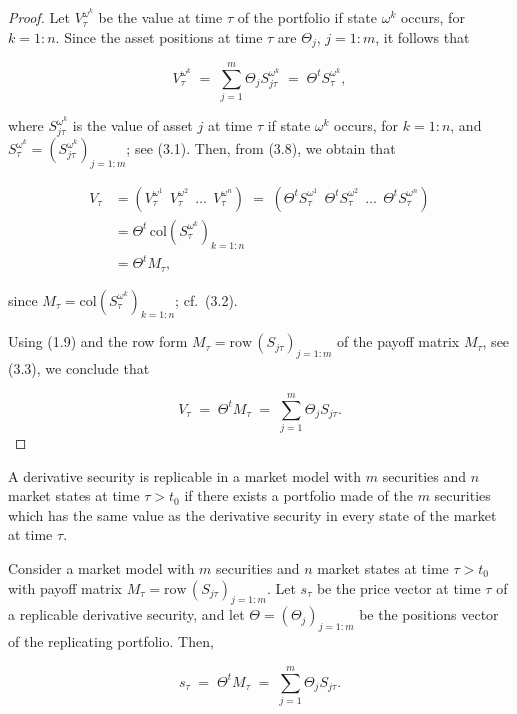\begin{proof}
Let $V_\tau^{\omega^k}$ be the value at time $\tau$ of the portfolio if
state $\omega^k$ occurs, for $k = 1:n$. Since the asset positions at time
$\tau$ are $\Theta_j$, $j = 1:m$, it follows that

\begin{equation}
V_\tau^{\omega^k} \;=\; \sum_{j=1}^m \Theta_j S_{j\tau}^{\omega^k} \;=\;
\Theta^t S_\tau^{\omega^k},
\end{equation}

where $S_{j\tau}^{\omega^k}$ is the value of asset $j$ at time $\tau$ if
state $\omega^k$ occurs, for $k = 1:n$, and $S_\tau^{\omega^k} =
\left(S_{j\tau}^{\omega^k}\right)_{j=1:m}$; see (3.1). Then, from (3.8), we
obtain that

\[
\begin{aligned}
V_\tau &= \left(V_\tau^{\omega^1}\ \ V_\tau^{\omega^2}\ \ \ldots\ \
V_\tau^{\omega^n}\right) \;=\; \left(\Theta^t S_\tau^{\omega^1}\ \ \Theta^t
S_\tau^{\omega^2}\ \ \ldots\ \ \Theta^t S_\tau^{\omega^n}\right) \\
&= \Theta^t\,\mathrm{col}\left(S_\tau^{\omega^k}\right)_{k=1:n} \\
&= \Theta^t M_\tau,
\end{aligned}
\]

since $M_\tau = \mathrm{col}\left(S_\tau^{\omega^k}\right)_{k=1:n}$; cf.\
(3.2).

Using (1.9) and the row form $M_\tau = \mathrm{row}\,(S_{j\tau})_{j=1:m}$
of the payoff matrix $M_\tau$, see (3.3), we conclude that

\[
V_\tau \;=\; \Theta^t M_\tau \;=\; \sum_{j=1}^m \Theta_j S_{j\tau}.
\]
\end{proof}

\begin{definition}
A derivative security is replicable in a market model with $m$ securities
and $n$ market states at time $\tau > t_0$ if there exists a portfolio
made of the $m$ securities which has the same value as the derivative
security in every state of the market at time $\tau$.
\end{definition}

\begin{lemma}
Consider a market model with $m$ securities and $n$ market states at time
$\tau > t_0$ with payoff matrix $M_\tau = \mathrm{row}\,(S_{j\tau})_{j=1:m}$.
Let $s_\tau$ be the price vector at time $\tau$ of a replicable derivative
security, and let $\Theta = (\Theta_j)_{j=1:m}$ be the positions vector of
the replicating portfolio. Then,

\begin{equation}
s_\tau \;=\; \Theta^t M_\tau \;=\; \sum_{j=1}^m \Theta_j S_{j\tau}.
\end{equation}
\end{lemma}


